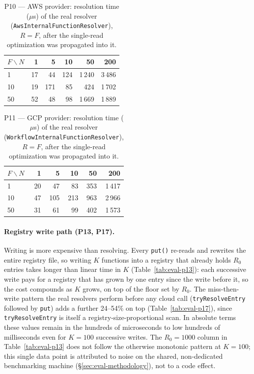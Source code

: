 \begin{table}[htbp]
  \centering
  \caption{P10 --- AWS provider: resolution time ($\mu$s) of the real resolver
  (\texttt{Aws\allowbreak Internal\allowbreak Function\allowbreak Resolver}), $R{=}F$, after the
  single-read optimization was propagated into it.}
  \label{tab:eval-p10}
  \begin{tabular}{lrrrrr}
    \hline
    $F\backslash N$ & 1 & 5 & 10 & 50 & 200 \\
    \hline
    1  & 17 & 44  & 124 & 1\,240 & 3\,486 \\
    10 & 19 & 171 & 85  & 424    & 1\,702 \\
    50 & 52 & 48  & 98  & 1\,669 & 1\,889 \\
    \hline
  \end{tabular}
\end{table}

\begin{table}[htbp]
  \centering
  \caption{P11 --- GCP provider: resolution time ($\mu$s) of the real resolver
  (\texttt{Workflow\allowbreak Internal\allowbreak Function\allowbreak Resolver}), $R{=}F$, after
  the single-read optimization was propagated into it.}
  \label{tab:eval-p11}
  \begin{tabular}{lrrrrr}
    \hline
    $F\backslash N$ & 1 & 5 & 10 & 50 & 200 \\
    \hline
    1  & 20 & 47  & 83  & 353 & 1\,417 \\
    10 & 47 & 105 & 213 & 963 & 2\,966 \\
    50 & 31 & 61  & 99  & 402 & 1\,573 \\
    \hline
  \end{tabular}
\end{table}

\paragraph{Registry write path (P13, P17).}
Writing is more expensive than resolving. Every \texttt{put()} re-reads and rewrites the entire
registry file, so writing $K$ functions into a registry that already holds $R_0$ entries takes
longer than linear time in $K$ (Table~\ref{tab:eval-p13}): each successive write pays for a
registry that has grown by one entry since the write before it, so the cost compounds as $K$
grows, on top of the floor set by $R_0$. The miss-then-write pattern the real resolvers perform
before any cloud call (\texttt{tryResolveEntry} followed by \texttt{put}) adds a further
24--54\% on top (Table~\ref{tab:eval-p17}), since \texttt{tryResolveEntry} is itself a
registry-size-proportional scan. In absolute terms these values remain
in the hundreds of microseconds to low hundreds of milliseconds even for $K{=}100$ successive
writes. The $R_0{=}1000$ column in Table~\ref{tab:eval-p13} does not follow the otherwise
monotonic pattern at $K{=}100$; this single data point is attributed to noise on the shared,
non-dedicated benchmarking machine (\S\ref{sec:eval-methodology}), not to a code effect.

